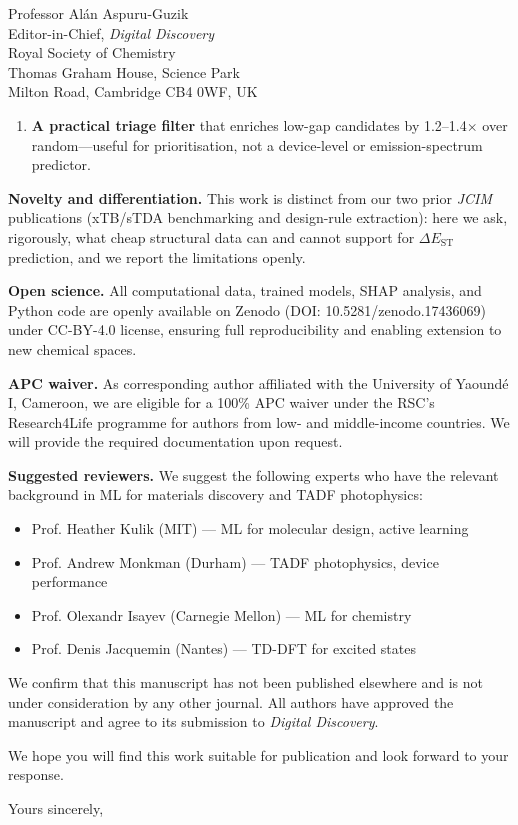 \documentclass[12pt,a4paper]{letter}
\begin{document}
\begin{letter}{
  Professor Alán Aspuru-Guzik\\
  Editor-in-Chief, \textit{Digital Discovery}\\
  Royal Society of Chemistry\\
  Thomas Graham House, Science Park\\
  Milton Road, Cambridge CB4 0WF, UK
}
\begin{enumerate}
  \item \textbf{A practical triage filter} that enriches low-gap candidates by
  \num{1.2}--\num{1.4}$\times$ over random---useful for prioritisation, not a
  device-level or emission-spectrum predictor.
\end{enumerate}

\textbf{Novelty and differentiation.}
This work is distinct from our two prior \textit{JCIM} publications
(xTB/sTDA benchmarking and design-rule extraction): here we ask, rigorously,
what cheap structural data can and cannot support for $\Delta E_\text{ST}$
prediction, and we report the limitations openly.

\textbf{Open science.}
All computational data, trained models, SHAP analysis, and Python code are
openly available on Zenodo (DOI: 10.5281/zenodo.17436069) under CC-BY-4.0
license, ensuring full reproducibility and enabling extension to new
chemical spaces.

\textbf{APC waiver.}
As corresponding author affiliated with the University of Yaoundé I,
Cameroon, we are eligible for a 100\% APC waiver under the RSC's
Research4Life programme for authors from low- and middle-income countries.
We will provide the required documentation upon request.

\textbf{Suggested reviewers.}
We suggest the following experts who have the relevant background in ML
for materials discovery and TADF photophysics:
\begin{itemize}
  \item Prof. Heather Kulik (MIT) --- ML for molecular design, active learning
  \item Prof. Andrew Monkman (Durham) --- TADF photophysics, device performance
  \item Prof. Olexandr Isayev (Carnegie Mellon) --- ML for chemistry
  \item Prof. Denis Jacquemin (Nantes) --- TD-DFT for excited states
\end{itemize}

We confirm that this manuscript has not been published elsewhere and is not
under consideration by any other journal.
All authors have approved the manuscript and agree to its submission to
\textit{Digital Discovery}.

We hope you will find this work suitable for publication and look forward
to your response.

\closing{Yours sincerely,}

\end{letter}
\end{document}
